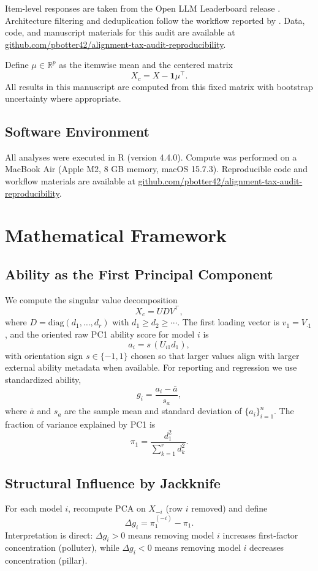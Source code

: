 \documentclass[11pt]{article}
\begin{document}
Item-level responses are taken from the Open LLM Leaderboard release \citep{openllmleaderboard2024}. Architecture filtering and deduplication follow the workflow reported by \citet{ilic2024interrelated}. Data, code, and manuscript materials for this audit are available at \href{https://github.com/pbotter42/alignment-tax-audit-reproducibility}{github.com/pbotter42/alignment-tax-audit-reproducibility}.

Define $\mu \in \mathbb{R}^{p}$ as the itemwise mean and the centered matrix
\[
X_c = X - \mathbf{1}\mu^\top.
\]
All results in this manuscript are computed from this fixed matrix with bootstrap uncertainty where appropriate.

\subsection{Software Environment}
All analyses were executed in R (version 4.4.0). Compute was performed on a MacBook Air (Apple M2, 8 GB memory, macOS 15.7.3). Reproducible code and workflow materials are available at \href{https://github.com/pbotter42/alignment-tax-audit-reproducibility}{github.com/pbotter42/alignment-tax-audit-reproducibility}.

\section{Mathematical Framework}
\subsection{Ability as the First Principal Component}
We compute the singular value decomposition
\[
X_c = UDV^\top,
\]
where $D=\mathrm{diag}(d_1,\ldots,d_r)$ with $d_1 \ge d_2 \ge \cdots$. The first loading vector is $v_1 = V_{\cdot 1}$, and the oriented raw PC1 ability score for model $i$ is
\[
a_i = s\,(U_{i1}d_1),
\]
with orientation sign $s \in \{-1,1\}$ chosen so that larger values align with larger external ability metadata when available. For reporting and regression we use standardized ability,
\[
g_i = \frac{a_i-\bar a}{s_a},
\]
where $\bar a$ and $s_a$ are the sample mean and standard deviation of $\{a_i\}_{i=1}^n$. The fraction of variance explained by PC1 is
\[
\pi_1 = \frac{d_1^2}{\sum_{k=1}^{r} d_k^2}.
\]

\subsection{Structural Influence by Jackknife}
For each model $i$, recompute PCA on $X_{-i}$ (row $i$ removed) and define
\[
\Delta g_i = \pi_1^{(-i)} - \pi_1.
\]
Interpretation is direct: $\Delta g_i>0$ means removing model $i$ increases first-factor concentration (polluter), while $\Delta g_i<0$ means removing model $i$ decreases concentration (pillar).
\end{document}
